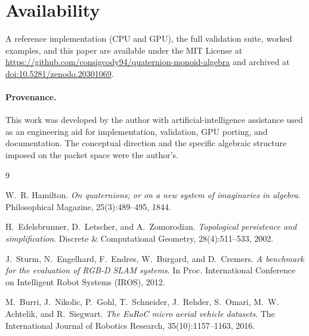 \documentclass[11pt]{article}
\begin{document}
\section{Availability}

A reference implementation (CPU and GPU), the full validation suite, worked
examples, and this paper are available under the MIT License at
\url{https://github.com/consigcody94/quaternion-monoid-algebra} and archived at
\href{https://doi.org/10.5281/zenodo.20301069}{doi:10.5281/zenodo.20301069}.

\paragraph{Provenance.}
This work was developed by the author with artificial-intelligence assistance
used as an engineering aid for implementation, validation, GPU porting, and
documentation. The conceptual direction and the specific algebraic structure
imposed on the packet space were the author's.

\begin{thebibliography}{9}

W.~R. Hamilton.
\textit{On quaternions; or on a new system of imaginaries in algebra}.
Philosophical Magazine, 25(3):489--495, 1844.

H.~Edelsbrunner, D.~Letscher, and A.~Zomorodian.
\textit{Topological persistence and simplification}.
Discrete \& Computational Geometry, 28(4):511--533, 2002.

J.~Sturm, N.~Engelhard, F.~Endres, W.~Burgard, and D.~Cremers.
\textit{A benchmark for the evaluation of RGB-D SLAM systems}.
In Proc. International Conference on Intelligent Robot Systems (IROS), 2012.

M.~Burri, J.~Nikolic, P.~Gohl, T.~Schneider, J.~Rehder, S.~Omari,
M.~W. Achtelik, and R.~Siegwart.
\textit{The EuRoC micro aerial vehicle datasets}.
The International Journal of Robotics Research, 35(10):1157--1163, 2016.

\end{thebibliography}
\end{document}
